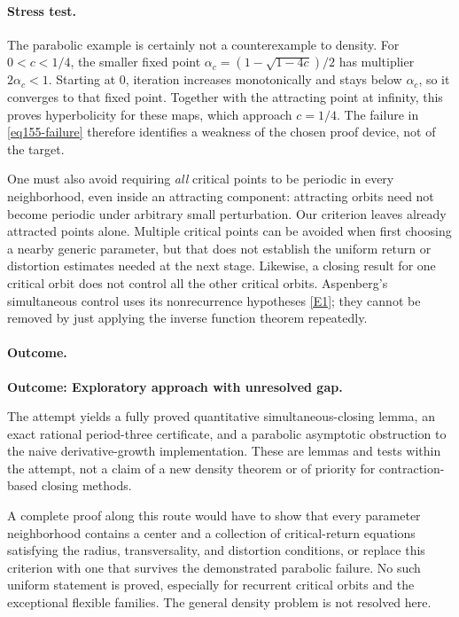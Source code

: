 \documentclass[11pt,a4paper]{article}
\newcommand{\eref}[2]{\hyperlink{extra:#1:#2}{[E#2]}}
\numberwithin{equation}{section}
\begin{document}
\paragraph{Stress test.}
The parabolic example is certainly not a counterexample to density. For
$0<c<1/4$, the smaller fixed point
$\alpha_c=(1-\sqrt{1-4c})/2$ has multiplier $2\alpha_c<1$.
Starting at $0$, iteration increases monotonically and stays below
$\alpha_c$, so it converges to that fixed point. Together with the
attracting point at infinity, this proves hyperbolicity for these maps,
which approach $c=1/4$. The failure in \eqref{eq155-failure} therefore
identifies a weakness of the chosen proof device, not of the target.

One must also avoid requiring \emph{all} critical points to be periodic in
every neighborhood, even inside an attracting component: attracting
orbits need not become periodic under arbitrary small perturbation. Our
criterion leaves already attracted points alone. Multiple critical points
can be avoided when first choosing a nearby generic parameter, but that
does not establish the uniform return or distortion estimates needed at
the next stage. Likewise, a closing result for one critical orbit does not
control all the other critical orbits. Aspenberg's simultaneous control
uses its nonrecurrence hypotheses \eref{30006757}{1}; they cannot be removed
by just applying the inverse function theorem repeatedly.

\paragraph{Outcome.}
\textbf{Outcome: Exploratory approach with unresolved gap.}

The attempt yields a fully proved quantitative simultaneous-closing lemma,
an exact rational period-three certificate, and a parabolic asymptotic
obstruction to the naive derivative-growth implementation. These are
lemmas and tests within the attempt, not a claim of a new density theorem
or of priority for contraction-based closing methods.

A complete proof along this route would have to show that every parameter
neighborhood contains a center and a collection of critical-return equations
satisfying the radius, transversality, and distortion conditions, or replace
this criterion with one that survives the demonstrated parabolic failure.
No such uniform statement is proved, especially for recurrent critical
orbits and the exceptional flexible families. The general density problem
is not resolved here.
\end{document}
